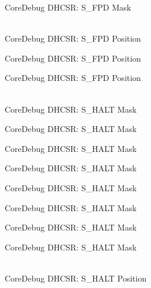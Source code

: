 \begin{DoxyRefList}
\label{deprecated__deprecated000567}%
%
Core\+Debug DHCSR:\+ S\+\_\+\+FPD Mask  
\item[{\parbox[t]{\linewidth}{Global \doxylink{group__CMSIS__SCB_ga620b141720c475f5bde4138855c6ed83}{Core\+Debug\+\_\+\+DHCSR\+\_\+\+S\+\_\+\+FPD\+\_\+\+Pos} }}]\hfill \\
\label{deprecated__deprecated000013}%
%
Core\+Debug DHCSR:\+ S\+\_\+\+FPD Position 

\label{deprecated__deprecated000464}%
%
Core\+Debug DHCSR:\+ S\+\_\+\+FPD Position 

\label{deprecated__deprecated000566}%
%
Core\+Debug DHCSR:\+ S\+\_\+\+FPD Position  
\item[{\parbox[t]{\linewidth}{Global \doxylink{group__CMSIS__CoreDebug_ga9f881ade3151a73bc5b02b73fe6473ca}{Core\+Debug\+\_\+\+DHCSR\+\_\+\+S\+\_\+\+HALT\+\_\+\+Msk} }}]\hfill \\
\label{deprecated__deprecated000026}%
%
Core\+Debug DHCSR:\+ S\+\_\+\+HALT Mask 

\label{deprecated__deprecated000118}%
%
Core\+Debug DHCSR:\+ S\+\_\+\+HALT Mask 

\label{deprecated__deprecated000172}%
%
Core\+Debug DHCSR:\+ S\+\_\+\+HALT Mask 

\label{deprecated__deprecated000257}%
%
Core\+Debug DHCSR:\+ S\+\_\+\+HALT Mask 

\label{deprecated__deprecated000314}%
%
Core\+Debug DHCSR:\+ S\+\_\+\+HALT Mask 

\label{deprecated__deprecated000390}%
%
Core\+Debug DHCSR:\+ S\+\_\+\+HALT Mask 

\label{deprecated__deprecated000477}%
%
Core\+Debug DHCSR:\+ S\+\_\+\+HALT Mask 

\label{deprecated__deprecated000579}%
%
Core\+Debug DHCSR:\+ S\+\_\+\+HALT Mask  
\item[{\parbox[t]{\linewidth}{Global \doxylink{group__CMSIS__CoreDebug_ga760a9a0d7f39951dc3f07d01f1f64772}{Core\+Debug\+\_\+\+DHCSR\+\_\+\+S\+\_\+\+HALT\+\_\+\+Pos} }}]\hfill \\
\label{deprecated__deprecated000025}%
%
Core\+Debug DHCSR:\+ S\+\_\+\+HALT Position 


\end{DoxyRefList}
